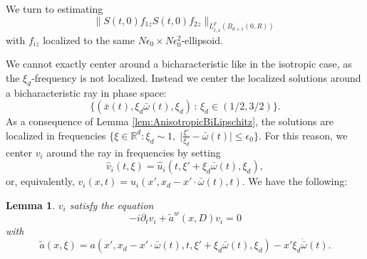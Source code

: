 \documentclass{amsart}
\newtheorem{lemma}[theorem]{Lemma}
\theoremstyle{definition}
\newcommand{\R}{\mathbb{R}}
\begin{document}
We turn to estimating 
\begin{equation*}
\| S(t,0) f_{1z} S(t,0) f_{2z} \|_{L^p_{t,x}(B_{d+1}(0,R))}
\end{equation*}
with $f_{iz}$ localized to the same $N\epsilon_0 \times N \epsilon_0^2$-ellipsoid.

We cannot exactly center around a bicharacteristic like in the isotropic case, as the $\xi_d$-frequency is not localized. Instead we center the localized solutions around a bicharacteristic ray in phase space:
\begin{equation*}
\{ (\bar{x}(t), \xi_d \bar{\omega}(t), \xi_d) \, : \, \xi_d \in (1/2,3/2) \}.
\end{equation*}
As a consequence of Lemma \ref{lem:AnisotropicBiLipschitz}, the solutions are localized in frequencies $\{ \xi \in \R^d: \xi_d \sim 1, \; \big| \frac{\xi'}{\xi_d} - \bar{\omega}(t) | \leq \epsilon_0 \}$. For this reason, we center $v_i$ around the ray in frequencies by setting
\begin{equation*}
\hat{v}_i(t,\xi) = \hat{u}_i(t,\xi'+\xi_d \bar{\omega}(t) , \xi_d),
\end{equation*}
or, equivalently, $v_i(x,t) = u_i(x',x_d-x'\cdot \bar{\omega}(t),t)$.
We have the following:
\begin{lemma}
$v_i$ satisfy the equation
\begin{equation*}
-i \partial_t v_i + \tilde{a}^w(x,D) v_i = 0
\end{equation*}
with 
\begin{equation*}
\tilde{a}(x,\xi) = a(x',x_d-x' \cdot \bar{\omega}(t), t,\xi'+\xi_d \bar{\omega}(t),\xi_d) - x' \xi_d \dot{\bar{\omega}}(t).
\end{equation*}
\end{lemma}
\end{document}
